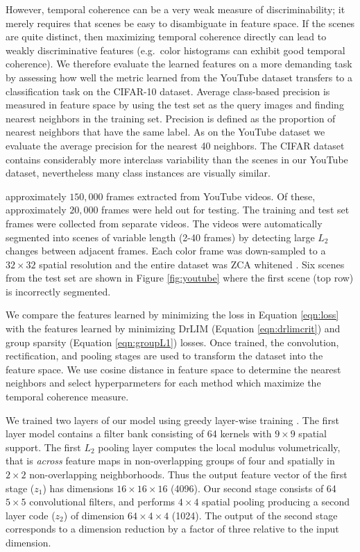 However, temporal coherence can be a very weak measure of discriminability; it
merely requires that scenes be easy to disambiguate in feature space. If the
scenes are quite distinct, then maximizing temporal coherence directly can lead
to weakly discriminative features (e.g.~color histograms can exhibit good
temporal coherence). We therefore evaluate the learned features on a more
demanding task by assessing how well the metric learned from the YouTube
dataset transfers to a classification task on the CIFAR-10 dataset. Average
class-based precision is measured in feature space by using the test set as the
query images and finding nearest neighbors in the training set. Precision is
defined as the proportion of nearest neighbors that have the same label. As on
the YouTube dataset we evaluate the average precision for the nearest 40
neighbors. The CIFAR dataset contains considerably more interclass variability
than the scenes in our YouTube dataset, nevertheless many class instances are
visually similar.  

approximately $150,000$ frames extracted from YouTube videos. Of these,
approximately $20,000$ frames were held out for testing. The training and test
set frames were collected from separate videos. The videos were automatically
segmented into scenes of variable length (2-40 frames) by detecting large $L_2$
changes between adjacent frames. Each color frame was down-sampled to a $32
\times 32$ spatial resolution and the entire dataset was ZCA whitened
\cite{alexthesis}. Six scenes from the test set are shown in Figure
\ref{fig:youtube} where the first scene (top row) is incorrectly segmented.   

We compare the features learned by minimizing the loss in Equation
\ref{eqn:loss} with the features learned by minimizing DrLIM (Equation
\ref{eqn:drlimcrit}) and group sparsity (Equation \ref{eqn:groupL1}) losses.
Once trained, the convolution, rectification, and pooling stages are used to
transform the dataset into the feature space. We use cosine distance in feature
space to determine the nearest neighbors and select hyperparmeters for each
method which maximize the temporal coherence measure.

We trained two layers of our model using greedy layer-wise training
\cite{Bengio2012}. The first layer model contains a filter bank consisting of
64 kernels with $9 \times 9$ spatial support. The first $L_2$ pooling layer
computes the local modulus volumetrically, that is \emph{across} feature maps
in non-overlapping groups of four and spatially in $2 \times 2$ non-overlapping
neighborhoods. Thus the output feature vector of the first stage ($z_1$) has
dimensions $16 \times 16 \times 16$ (4096). Our second stage consists of 64 $5
\times 5$ convolutional filters, and performs $4 \times 4$ spatial pooling
producing a second layer code ($z_2$) of dimension $64 \times 4 \times 4$
(1024). The output of the second stage corresponds to a dimension reduction by
a factor of three relative to the input dimension.

